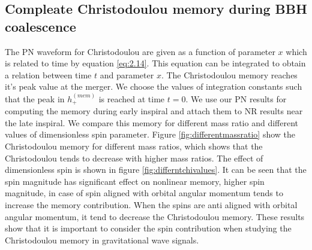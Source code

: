 \documentclass[twocolumn,showpacs,aps,prd,nobibnotes,floatfix]{revtex4-1}
\begin{document}
\subsection{Compleate Christodoulou memory during BBH coalescence} 
The PN waveform for Christodoulou are given as a function of parameter $x$ which is related to time by equation \ref{eq:2.14}. This equation can be integrated to obtain a relation between time $t$ and parameter $x$. The Christodoulou memory reaches it's peak value at the merger. We choose the values of integration constants such that the peak in $h_+^{(mem)}$ is reached at time $t=0$. We use our PN results for computing the memory during early inspiral and attach them to NR results near the late inspiral. We compare this memory for different mass ratio and different values of dimensionless spin parameter. Figure \ref{fig:differentmassratio} show the Christodoulou memory for different mass ratios, which shows that the Christodoulou tends to decrease with higher mass ratios. The effect of dimensionless spin is shown in figure \ref{fig:differntchivalues}. It can be seen that the spin magnitude has significant effect on nonlinear memory, higher spin magnitude, in case of spin aligned with orbital angular momentum tends to increase the memory contribution. When the spins are anti aligned with orbital angular momentum, it tend to decrease the Christodoulou memory. These results show that it is important to consider the spin contribution when studying the Christodoulou memory in gravitational wave signals. 

\end{document}
